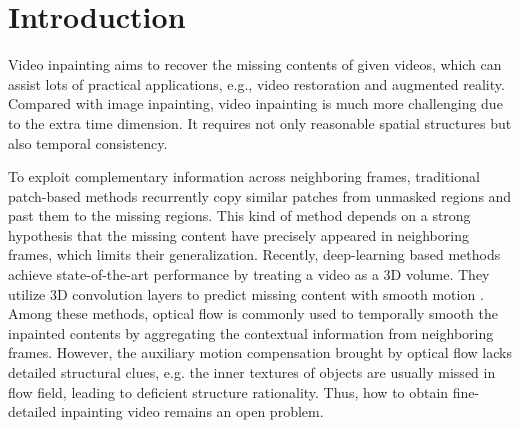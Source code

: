 \section{Introduction}


Video inpainting aims to recover the missing contents of given videos, which can assist lots of practical applications, e.g., video restoration and augmented reality. Compared with image inpainting, video inpainting is much more challenging due to the extra time dimension. It requires not only reasonable spatial structures but also temporal consistency. 



To exploit complementary information across neighboring frames, traditional patch-based methods \cite{patwardhan2007video,wexler2004space,newson2014video} recurrently copy similar patches from unmasked regions and past them to the missing regions. 
This kind of method depends on a strong hypothesis that the missing content have precisely appeared in neighboring frames, which limits their generalization.
Recently, deep-learning based methods achieve state-of-the-art performance by treating a video as a 3D volume.
They utilize 3D convolution layers to predict missing content with smooth motion \cite{wang2019video}.
Among these methods, optical flow is commonly used to temporally smooth the inpainted contents \cite{Xu_2019_CVPR,Kim_2019_CVPR,Kim_2019_CVPR1} by aggregating the contextual information from neighboring frames.
However, the auxiliary motion compensation brought by optical flow lacks detailed structural clues, e.g. the inner textures of objects are usually missed in flow field, leading to deficient structure rationality.
Thus, how to obtain fine-detailed inpainting video remains an open problem.




